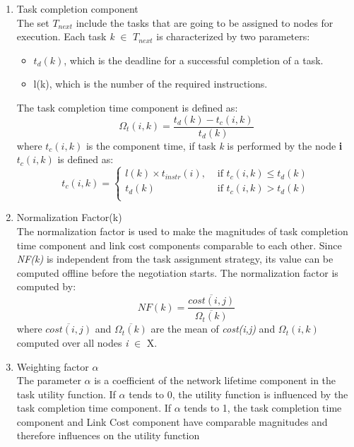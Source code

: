 \documentclass[a4paper]{article}
\begin{document}
\begin{enumerate}
\item Task completion component \\
The set $T_{next}$ include the tasks that are going to be assigned to nodes for execution. Each task \textit{k} $\in$ $T_{next}$ is characterized by two parameters: 
\begin{itemize}  
\item $t_d(k)$, which is the deadline for a successful completion of a task.
\item l(k), which is the number of the required instructions. 
\end{itemize}
The task completion time component is defined as: 
\begin{equation}
\Omega_t(i,k) = \frac{t_d(k) - t_c(i,k)}{t_d(k)}
\end{equation}
where $t_c(i,k)$ is the component time, if task \textit{k} is performed by the node \textbf{i} $t_c(i,k)$ is defined as: 
$$
t_c(i,k) = \left\{ \begin{array}{lr}
 l(k) \times t_{instr}(i), &\mbox{ if $t_c(i,k) \le t_d(k)$} \\
  t_d(k) &\mbox{ if $t_c(i,k) > t_d(k)$} \\
       \end{array} \right.
$$
\item Normalization Factor(k) \\
The normalization factor is used to make the magnitudes of task completion time component and link cost components comparable to each other. Since \textit{NF(k)} is independent from the task assignment strategy, its value can be computed offline before the negotiation starts. The normalization factor is computed by: 
\begin{equation}
NF(k)= \frac{\overline{cost(i,j)}}{\overline{\Omega_t(k)}}
\end{equation}
where $\overline{cost(i,j)}$ and $\overline{\Omega_t(k)}$ are the mean of \textit{cost(i,j)} and \textit{$\Omega_t(i,k)$} computed over all nodes \textit{i} $\in$ X.
\item Weighting factor $\alpha$\\
The parameter $\alpha$  is a coefficient of the network lifetime component in the task utility function. If $\alpha$ tends to 0, the utility function is influenced by the task completion time component. If $\alpha$ tends to 1, the task completion time component and Link Cost component have comparable magnitudes and therefore influences on the utility function


\end{enumerate}
\end{document}

